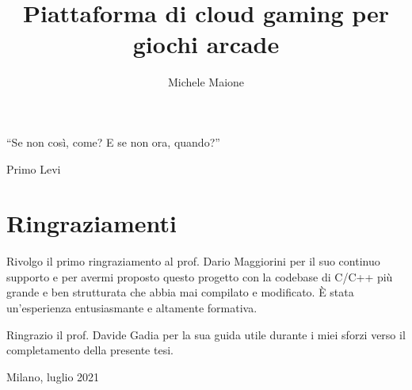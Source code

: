\documentclass[openany]{book}
\title{Piattaforma di cloud gaming per giochi arcade}
\author{Michele Maione}
\newcounter{savepage}
\begin{document}


\frontmatter
{
\raggedleft \large %
	``Se non così, come? E se non ora, quando?''
	
	\bigskip
	
	\textemdash Primo Levi\\
}

\chapter*{Ringraziamenti}
Rivolgo il primo ringraziamento al prof. Dario Maggiorini per il suo continuo supporto e per avermi proposto questo progetto con la codebase di C/C++ più grande e ben strutturata che abbia mai compilato e modificato. È stata un'esperienza entusiasmante e altamente formativa.

Ringrazio il prof. Davide Gadia per la sua guida utile durante i miei sforzi verso il completamento della presente tesi.

\begin{flushright}
	Milano, luglio 2021
\end{flushright}




\newpage
\setcounter{tocdepth}{2}
\tableofcontents



\newpage
{}

\mainmatter






\appendix
\newpage
{}
\setcounter{page}{\thesavepage}

%
%


%
%


\backmatter
\printbibliography[nottype=misc,title={Bibliografia},heading=bibintoc]
\printbibliography[type=misc,title={Sitografia},heading=bibintoc]

\newpage
\listoffigures

\newpage
\listoftables

\newpage
{}

\end{document}
